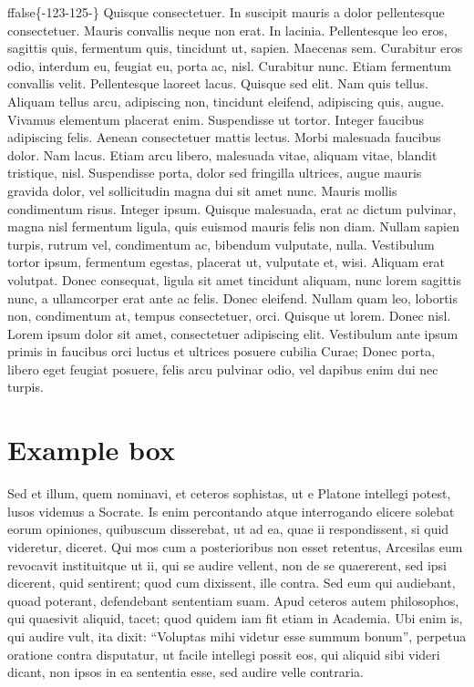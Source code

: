 \documentclass[twoside]{extreport}
\begin{document}
\begin{block}{}
ffalse\{-123-125-\}\fi{} Quisque consectetuer. In suscipit mauris a dolor
pellentesque consectetuer. Mauris convallis neque non erat. In lacinia.
Pellentesque leo eros, sagittis quis, fermentum quis, tincidunt ut,
sapien. Maecenas sem. Curabitur eros odio, interdum eu, feugiat eu,
porta ac, nisl. Curabitur nunc. Etiam fermentum convallis velit.
Pellentesque laoreet lacus. Quisque sed elit. Nam quis tellus. Aliquam
tellus arcu, adipiscing non, tincidunt eleifend, adipiscing quis, augue.
Vivamus elementum placerat enim. Suspendisse ut tortor. Integer faucibus
adipiscing felis. Aenean consectetuer mattis lectus. Morbi malesuada
faucibus dolor. Nam lacus. Etiam arcu libero, malesuada vitae, aliquam
vitae, blandit tristique, nisl.
Suspendisse porta, dolor sed fringilla ultrices, augue
mauris gravida dolor, vel sollicitudin magna dui sit amet nunc. Mauris
mollis condimentum risus. Integer ipsum. Quisque malesuada, erat ac
dictum pulvinar, magna nisl fermentum ligula, quis euismod mauris felis
non diam. Nullam sapien turpis, rutrum vel, condimentum ac, bibendum
vulputate, nulla. Vestibulum tortor ipsum, fermentum egestas, placerat
ut, vulputate et, wisi. Aliquam erat volutpat. Donec consequat, ligula
sit amet tincidunt aliquam, nunc lorem sagittis nunc, a ullamcorper erat
ante ac felis. Donec eleifend. Nullam quam leo, lobortis non,
condimentum at, tempus consectetuer, orci. Quisque ut lorem. Donec nisl.
Lorem ipsum dolor sit amet, consectetuer adipiscing elit. Vestibulum
ante ipsum primis in faucibus orci luctus et ultrices posuere cubilia
Curae; Donec porta, libero eget feugiat posuere, felis arcu pulvinar
odio, vel dapibus enim dui nec turpis. \end{block}

\hypertarget{example-box}{%
\section{Example box}\label{example-box}}

Sed et illum, quem nominavi, et ceteros sophistas, ut e Platone
intellegi potest, lusos videmus a Socrate. Is enim percontando atque
interrogando elicere solebat eorum opiniones, quibuscum disserebat, ut
ad ea, quae ii respondissent, si quid videretur, diceret. Qui mos cum a
posterioribus non esset retentus, Arcesilas eum revocavit instituitque
ut ii, qui se audire vellent, non de se quaererent, sed ipsi dicerent,
quid sentirent; quod cum dixissent, ille contra. Sed eum qui audiebant,
quoad poterant, defendebant sententiam suam. Apud ceteros autem
philosophos, qui quaesivit aliquid, tacet; quod quidem iam fit etiam in
Academia. Ubi enim is, qui audire vult, ita dixit: ``Voluptas mihi
videtur esse summum bonum'', perpetua oratione contra disputatur, ut
facile intellegi possit eos, qui aliquid sibi videri dicant, non ipsos
in ea sententia esse, sed audire velle contraria.
\end{document}
